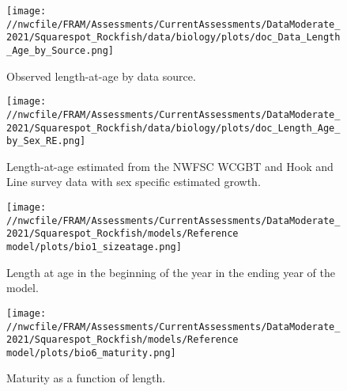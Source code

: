 \documentclass[11pt,
  english,
  a4paper,
]{article}
\begin{document}
\tagmcend\tagstructend


\begin{figure}
\centering
\texttt{[image: //nwcfile/FRAM/Assessments/CurrentAssessments/DataModerate\_2021/Squarespot\_Rockfish/data/biology/plots/doc\_Data\_Length\_Age\_by\_Source.png]}
\caption{Observed length-at-age by data source.\label{fig:len-age-data}}
\end{figure}

\tagmcend\tagstructend


\begin{figure}
\centering
\texttt{[image: //nwcfile/FRAM/Assessments/CurrentAssessments/DataModerate\_2021/Squarespot\_Rockfish/data/biology/plots/doc\_Length\_Age\_by\_Sex\_RE.png]}
\caption{Length-at-age estimated from the NWFSC WCGBT and Hook and Line survey data with sex specific estimated growth.\label{fig:len-age}}
\end{figure}

\tagmcend\tagstructend


\begin{figure}
\centering
\texttt{[image: //nwcfile/FRAM/Assessments/CurrentAssessments/DataModerate\_2021/Squarespot\_Rockfish/models/Reference model/plots/bio1\_sizeatage.png]}
\caption{Length at age in the beginning of the year in the ending year of the model.\label{fig:len-age-ss}}
\end{figure}

\tagmcend\tagstructend


\begin{figure}
\centering
\texttt{[image: //nwcfile/FRAM/Assessments/CurrentAssessments/DataModerate\_2021/Squarespot\_Rockfish/models/Reference model/plots/bio6\_maturity.png]}
\caption{Maturity as a function of length.\label{fig:maturity}}
\end{figure}
\end{document}
